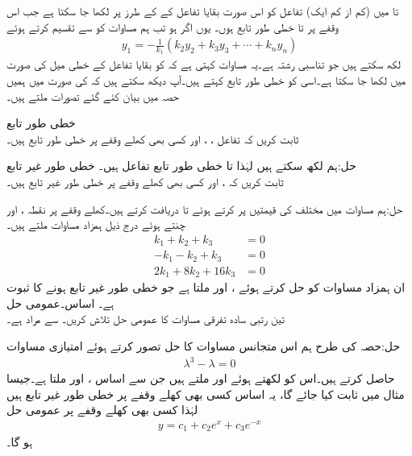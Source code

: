  تا  میں (کم از کم ایک) تفاعل کو اس صورت بقایا تفاعل کے  کے طرز پر لکھا جا سکتا ہے جب اس وقفے پر  تا  خطی طور تابع ہوں۔ یوں اگر  ہو تب ہم مساوات  کو  سے تقسیم کرتے ہوئے
\begin{align*}
y_1=-\frac{1}{k_1}(k_2 y_2+k_3y_3+\cdots+k_ny_n)
\end{align*}
 لکھ سکتے ہیں جو تناسبی رشتہ ہے۔یہ مساوات کہتی ہے کہ  کو بقایا تفاعل کے خطی میل کی صورت میں لکھا جا سکتا ہے۔اسی کو خطی طور تابع کہتے ہیں۔آپ دیکھ سکتے ہیں کہ  کی صورت میں ہمیں حصہ  میں بیان کئے گئے تصورات ملتے ہیں۔

\quad خطی طور تابع\\
ثابت کریں کہ تفاعل ، ،  اور  کسی بھی کھلے وقفے پر خطی طور تابع ہیں۔

حل:ہم  لکھ سکتے ہیں لہٰذا  تا  خطی طور تابع تفاعل ہیں۔
\quad خطی طور غیر تابع\\
ثابت کریں کہ ،  اور   کسی بھی کھلے وقفے پر خطی طور غیر تابع ہیں۔

حل:ہم  مساوات  میں مختلف  کی قیمتیں پر کرتے ہوئے  تا  دریافت کرتے ہیں۔کھلے وقفے پر نقطہ ،  اور  چنتے ہوئے درج ذیل ہمزاد مساوات ملتے ہیں۔
\begin{align*}
k_1+k_2+k_3&=0\\
-k_1-k_2+k_3&=0\\
2k_1+8k_2+16k_3&=0
\end{align*}
ان ہمزاد مساوات کو حل کرتے ہوئے ،  اور  ملتا ہے جو خطی طور غیر تابع ہونے کا ثبوت ہے۔
\quad اساس۔عمومی حل\\
تین رتبی سادہ تفرقی مساوات  کا عمومی حل تلاش کریں۔  سے مراد  ہے۔

حل:حصہ  کی طرح ہم اس متجانس مساوات کا حل  تصور کرتے  ہوئے امتیازی مساوات
\begin{align*}
\lambda^3-\lambda=0
\end{align*}
حاصل کرتے ہیں۔اس کو  لکھتے ہوئے  اور  ملتے ہیں جن سے اساس ،  اور  ملتا ہے۔جیسا مثال  میں ثابت کیا جائے گا، یہ اساس کسی بھی کھلے وقفے پر خطی طور غیر تابع ہیں لہٰذا کسی بھی کھلے وقفے پر  عمومی حل 
\begin{align*}
y=c_1+c_2e^x+c_3e^{-x}
\end{align*}
ہو گا۔

